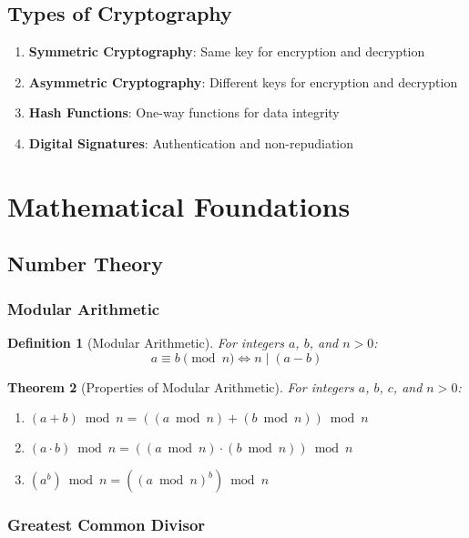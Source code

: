 \documentclass[11pt,a4paper]{article}
\newtheorem{theorem}{Theorem}[section]
\newtheorem{definition}[theorem]{Definition}
\begin{document}
\subsection{Types of Cryptography}

\begin{enumerate}
\item \textbf{Symmetric Cryptography}: Same key for encryption and decryption
\item \textbf{Asymmetric Cryptography}: Different keys for encryption and decryption
\item \textbf{Hash Functions}: One-way functions for data integrity
\item \textbf{Digital Signatures}: Authentication and non-repudiation
\end{enumerate}

\section{Mathematical Foundations}

\subsection{Number Theory}

\subsubsection{Modular Arithmetic}

\begin{definition}[Modular Arithmetic]
For integers $a$, $b$, and $n > 0$:
$$a \equiv b \pmod{n} \iff n \mid (a - b)$$
\end{definition}

\begin{theorem}[Properties of Modular Arithmetic]
For integers $a$, $b$, $c$, and $n > 0$:
\begin{enumerate}
\item $(a + b) \bmod n = ((a \bmod n) + (b \bmod n)) \bmod n$
\item $(a \cdot b) \bmod n = ((a \bmod n) \cdot (b \bmod n)) \bmod n$
\item $(a^b) \bmod n = ((a \bmod n)^b) \bmod n$
\end{enumerate}
\end{theorem}

\subsubsection{Greatest Common Divisor}
\end{document}
